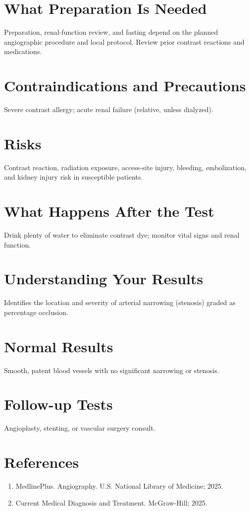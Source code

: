 \section*{What Preparation Is Needed}
Preparation, renal-function review, and fasting depend on the planned angiographic procedure and local protocol. Review prior contrast reactions and medications.

\section*{Contraindications and Precautions}
Severe contrast allergy; acute renal failure (relative, unless dialyzed).

\section*{Risks}
Contrast reaction, radiation exposure, access-site injury, bleeding, embolization, and kidney injury risk in susceptible patients.

\section*{What Happens After the Test}
Drink plenty of water to eliminate contrast dye; monitor vital signs and renal function.

\section*{Understanding Your Results}
Identifies the location and severity of arterial narrowing (stenosis) graded as percentage occlusion.

\section*{Normal Results}
Smooth, patent blood vessels with no significant narrowing or stenosis.

\section*{Follow-up Tests}
Angioplasty, stenting, or vascular surgery consult.

\section*{References}
\begin{enumerate}
  \item MedlinePlus. Angiography. U.S. National Library of Medicine; 2025.
  \item Current Medical Diagnosis and Treatment. McGraw-Hill; 2025.
\end{enumerate}

\clearpage
